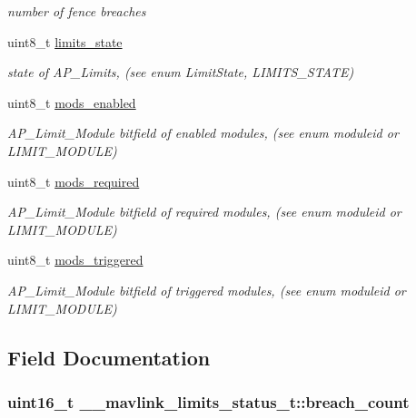 \begin{DoxyCompactItemize}
\begin{DoxyCompactList}\small\item\em number of fence breaches \end{DoxyCompactList}\item 
uint8\+\_\+t \hyperlink{struct____mavlink__limits__status__t_adbc320754ebc8df4d502d0ad209748bd}{limits\+\_\+state}
\begin{DoxyCompactList}\small\item\em state of A\+P\+\_\+\+Limits, (see enum Limit\+State, L\+I\+M\+I\+T\+S\+\_\+\+S\+T\+A\+T\+E) \end{DoxyCompactList}\item 
uint8\+\_\+t \hyperlink{struct____mavlink__limits__status__t_a1976338bf18897be8f5cf97898475079}{mods\+\_\+enabled}
\begin{DoxyCompactList}\small\item\em A\+P\+\_\+\+Limit\+\_\+\+Module bitfield of enabled modules, (see enum moduleid or L\+I\+M\+I\+T\+\_\+\+M\+O\+D\+U\+L\+E) \end{DoxyCompactList}\item 
uint8\+\_\+t \hyperlink{struct____mavlink__limits__status__t_a5c6d271b40d4106271f506fef6ec66ea}{mods\+\_\+required}
\begin{DoxyCompactList}\small\item\em A\+P\+\_\+\+Limit\+\_\+\+Module bitfield of required modules, (see enum moduleid or L\+I\+M\+I\+T\+\_\+\+M\+O\+D\+U\+L\+E) \end{DoxyCompactList}\item 
uint8\+\_\+t \hyperlink{struct____mavlink__limits__status__t_a8023524497cd6ae231dd32a3b80d0b9b}{mods\+\_\+triggered}
\begin{DoxyCompactList}\small\item\em A\+P\+\_\+\+Limit\+\_\+\+Module bitfield of triggered modules, (see enum moduleid or L\+I\+M\+I\+T\+\_\+\+M\+O\+D\+U\+L\+E) \end{DoxyCompactList}\end{DoxyCompactItemize}


\subsection{Field Documentation}
\hypertarget{struct____mavlink__limits__status__t_a1dfa5b199ed06265ddd1e824358fbfce}{
\subsubsection[{breach\+\_\+count}]{\setlength{\rightskip}{0pt plus 5cm}uint16\+\_\+t \+\_\+\+\_\+mavlink\+\_\+limits\+\_\+status\+\_\+t\+::breach\+\_\+count}}\label{struct____mavlink__limits__status__t_a1dfa5b199ed06265ddd1e824358fbfce}


